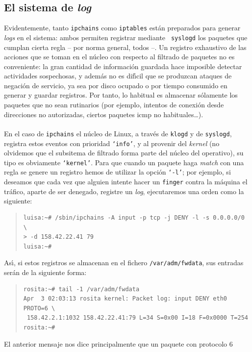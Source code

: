 \subsection{El sistema de {\it log}}
Evidentemente, tanto {\tt ipchains} como {\tt iptables} est\'an preparados para
generar {\it logs} en el sistema: ambos permiten registrar mediante {\tt 
syslogd} los paquetes que
cumplan cierta regla -- por norma general, todos --. Un registro exhaustivo de
las acciones que se toman en el n\'ucleo con respecto al filtrado de paquetes
no es conveniente: la gran cantidad de informaci\'on guardada hace imposible 
detectar actividades sospechosas, y adem\'as no es dif\'{\i}cil que se produzcan
ataques de negaci\'on de servicio, ya sea por disco ocupado o por tiempo 
consumido en generar y guardar registros. Por tanto, lo habitual es almacenar
s\'olamente los paquetes que no sean rutinarios (por ejemplo, intentos de
conexi\'on desde direcciones no autorizadas, ciertos paquetes {\sc icmp} no
habituales\ldots).\\
\\En el caso de {\tt ipchains} el n\'ucleo de Linux, a trav\'es de {\tt klogd} 
y de {\tt syslogd}, registra estos eventos con prioridad {\tt `info'}, y al 
provenir del {\it kernel} (no olvidemos que el subsitema de filtrado forma 
parte del n\'ucleo del operativo), su tipo es obviamente {\tt `kernel'}. Para 
que cuando un paquete haga {\it match} con una regla se genere un registro hemos
de utilizar la opci\'on {\tt `-l'}; por ejemplo, si deseamos que cada vez que
alguien intente hacer un {\tt finger} contra la m\'aquina el tr\'afico, aparte
de ser denegado, registre un {\it log}, ejecutaremos una orden como la
siguiente:
\begin{quote}
\begin{verbatim}
luisa:~# /sbin/ipchains -A input -p tcp -j DENY -l -s 0.0.0.0/0 \
> -d 158.42.22.41 79
luisa:~# 
\end{verbatim}
\end{quote}
As\'{\i}, si estos registros se almacenan en el fichero {\tt /var/adm/fwdata}, 
sus entradas ser\'an de la siguiente forma:
\begin{quote}
\begin{verbatim}
rosita:~# tail -1 /var/adm/fwdata
Apr  3 02:03:13 rosita kernel: Packet log: input DENY eth0 PROTO=6 \
 158.42.2.1:1032 158.42.22.41:79 L=34 S=0x00 I=18 F=0x0000 T=254
rosita:~# 
\end{verbatim}
\end{quote}
El anterior mensaje nos dice principalmente que un paquete con protocolo 6
